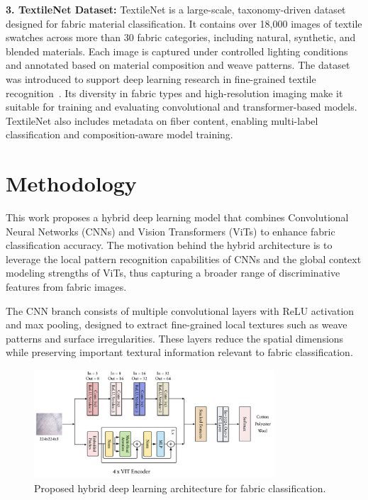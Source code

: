 \textbf{3. TextileNet Dataset:}
TextileNet is a large-scale, taxonomy-driven dataset designed for fabric material classification. It contains over 18,000 images of textile swatches across more than 30 fabric categories, including natural, synthetic, and blended materials. Each image is captured under controlled lighting conditions and annotated based on material composition and weave patterns. The dataset was introduced to support deep learning research in fine-grained textile recognition~\cite{zhong2020textilenet}. Its diversity in fabric types and high-resolution imaging make it suitable for training and evaluating convolutional and transformer-based models. TextileNet also includes metadata on fiber content, enabling multi-label classification and composition-aware model training.

\section*{Methodology}

This work proposes a hybrid deep learning model that combines Convolutional Neural Networks (CNNs) and Vision Transformers (ViTs) to enhance fabric classification accuracy. The motivation behind the hybrid architecture is to leverage the local pattern recognition capabilities of CNNs and the global context modeling strengths of ViTs, thus capturing a broader range of discriminative features from fabric images.

The CNN branch consists of multiple convolutional layers with ReLU activation and max pooling, designed to extract fine-grained local textures such as weave patterns and surface irregularities. These layers reduce the spatial dimensions while preserving important textural information relevant to fabric classification.

\begin{figure}[h]
    \centering
    \includegraphics[width=0.8\textwidth]{images/ModelDiagram.png}
    \caption{Proposed hybrid deep learning architecture for fabric classification.}
    \label{fig:model_diagram}
\end{figure}


